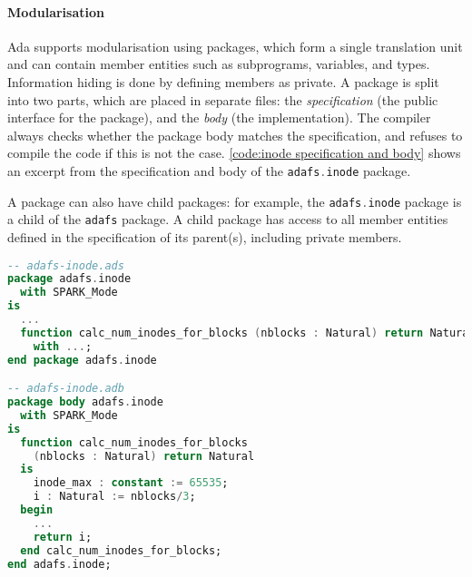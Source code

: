 \paragraph{Modularisation}
Ada supports modularisation using packages, which form a single translation unit and can contain member entities such as subprograms, variables, and types.
Information hiding is done by defining members as private.
A package is split into two parts, which are placed in separate files: the \textit{specification} (the public interface for the package), and the \textit{body} (the implementation).
The compiler always checks whether the package body matches the specification, and refuses to compile the code if this is not the case.
\autoref{code:inode specification and body} shows an excerpt from the specification and body of the \lstinline[language=Ada]{adafs.inode} package.

A package can also have child packages: for example, the \lstinline[language=Ada]{adafs.inode} package is a child of the \lstinline[language=Ada]{adafs} package.
A child package has access to all member entities defined in the specification of its parent(s), including private members.

\begin{lstlisting}[float=tb,caption={Excerpt from the adafs.inode package specification and body (ellipses denote code omitted for brevity).}, label={code:inode specification and body}, language=Ada]
-- adafs-inode.ads
package adafs.inode
  with SPARK_Mode
is
  ...
  function calc_num_inodes_for_blocks (nblocks : Natural) return Natural
    with ...;
end package adafs.inode

-- adafs-inode.adb
package body adafs.inode
  with SPARK_Mode
is
  function calc_num_inodes_for_blocks
    (nblocks : Natural) return Natural
  is
    inode_max : constant := 65535;
    i : Natural := nblocks/3;
  begin
    ...
    return i;
  end calc_num_inodes_for_blocks;
end adafs.inode;
\end{lstlisting}

